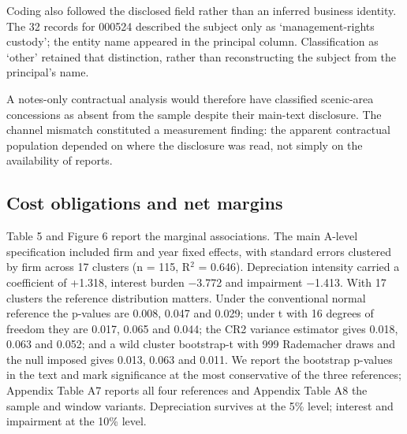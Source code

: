 \documentclass[review,3p,times]{elsarticle}
\begin{document}
Coding also followed the disclosed field rather than an inferred business identity. The 32 records for 000524 described the subject only as `management-rights custody'; the entity name appeared in the principal column. Classification as `other' retained that distinction, rather than reconstructing the subject from the principal's name.

A notes-only contractual analysis would therefore have classified scenic-area concessions as absent from the sample despite their main-text disclosure. The channel mismatch constituted a measurement finding: the apparent contractual population depended on where the disclosure was read, not simply on the availability of reports.

\subsection{Cost obligations and net margins}

Table 5 and Figure 6 report the marginal associations. The main A-level specification included firm and year fixed effects, with standard errors clustered by firm across 17 clusters (n = 115, R\ensuremath{^2} = 0.646). Depreciation intensity carried a coefficient of +1.318, interest burden \ensuremath{-}3.772 and impairment \ensuremath{-}1.413. With 17 clusters the reference distribution matters. Under the conventional normal reference the p-values are 0.008, 0.047 and 0.029; under t with 16 degrees of freedom they are 0.017, 0.065 and 0.044; the CR2 variance estimator gives 0.018, 0.063 and 0.052; and a wild cluster bootstrap-t with 999 Rademacher draws and the null imposed gives 0.013, 0.063 and 0.011. We report the bootstrap p-values in the text and mark significance at the most conservative of the three references; Appendix Table A7 reports all four references and Appendix Table A8 the sample and window variants. Depreciation survives at the 5\% level; interest and impairment at the 10\% level.
\end{document}
